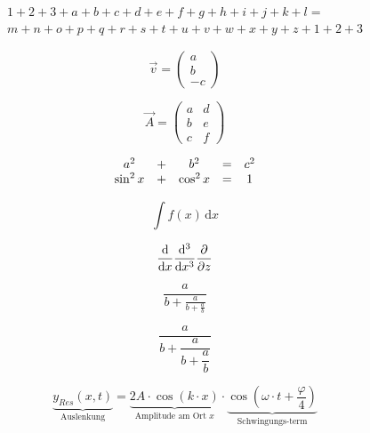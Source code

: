 \documentclass[a4paper, ngerman, oneside, 10pt]{article}
\begin{document}
\begin{multline}
	1+2+3+a+b+c+d+e+f+g+h+i+j+k+l= \\
	m+n+o+p+q+r+s+t+u+v+w+x+y+z+1+2+3
\end{multline}

\begin{equation}
	\vec{v}=
	\begin{pmatrix}
		a \\ b \\ -c
	\end{pmatrix}
\end{equation}

\begin{equation}
	\vec{A}=
	\begin{pmatrix}
		a & d \\
		b & e \\
		c & f
	\end{pmatrix}
\end{equation}

\begin{equation}
	\begin{array}[t]{c c c c c}
		a^2      & + & b^2      & = & c^2 \\
		\sin^2 x & + & \cos^2 x & = & 1
	\end{array}
\end{equation}


\begin{equation}
	\int f(x)\,\text{d}x
\end{equation}

\begin{equation}
	\dv{x} \\
	\dv[3]{x} \\
	\pdv{z}
\end{equation}

\begin{equation}
	\frac{a}{b+\frac{a}{b+\frac{a}{b}}}
\end{equation}

\begin{equation}
	\dfrac{a}{b+\dfrac{a}{b+\dfrac{a}{b}}}
\end{equation}

\begin{equation}
	\boxed{
	\underbrace{y_{Res}(x,t)}_{\text{Auslenkung}} =
	\underbrace{2A \cdot \cos \left( k \cdot x \right)}_{\text{Amplitude am Ort } x} \cdot
	\underbrace{\cos \left( \omega \cdot t + \frac{\varphi}{4} \right)}_{\text{Schwingungs-term}}
	}
\end{equation}
\end{document}
